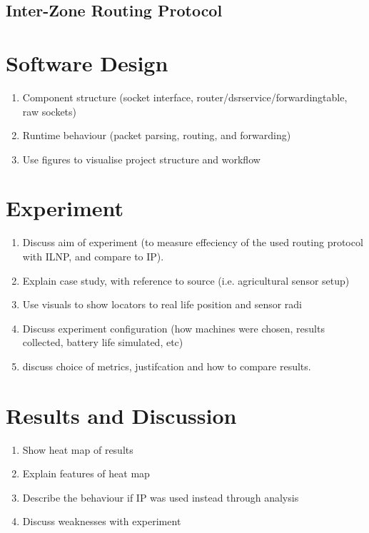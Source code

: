 \documentclass[12pt]{article}
\begin{document}
\subsection{Inter-Zone Routing Protocol}

\section{Software Design}

\begin{enumerate}
\item Component structure (socket interface, router/dsrservice/forwardingtable, raw sockets)
\item Runtime behaviour (packet parsing, routing, and forwarding)
\item Use figures to visualise project structure and workflow
\end{enumerate}

\section{Experiment}

\begin{enumerate}
\item Discuss aim of experiment (to measure effeciency of the used routing protocol with ILNP, and compare to IP).
\item Explain case study, with reference to source (i.e. agricultural sensor setup)
\item Use visuals to show locators to real life position and sensor radi
\item Discuss experiment configuration (how machines were chosen, results collected, battery life simulated, etc)
\item discuss choice of metrics, justifcation and how to compare results.
\end{enumerate}

\section{Results and Discussion}

\begin{enumerate}
\item Show heat map of results
\item Explain features of heat map
\item Describe the behaviour if IP was used instead through analysis
\item Discuss weaknesses with experiment
\end{enumerate}
\end{document}
